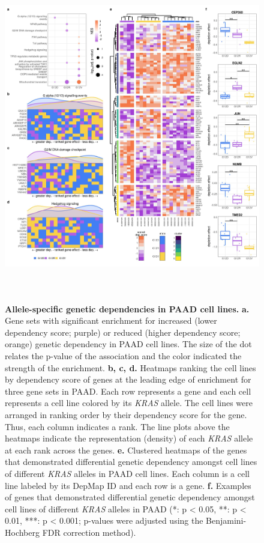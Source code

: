 \documentclass[english, 10pt, letterpaper]{article}
\newcommand{\KRAS}{\emph{KRAS}}
\begin{document}
\begin{figure}[p]
\centering
\includegraphics[height=145mm]{figures/Fig_5.jpeg}
\caption{
    \textbf{Allele-specific genetic dependencies in PAAD cell lines.}
    \textbf{a.} Gene sets with significant enrichment for increased (lower dependency score; purple) or reduced (higher dependency score; orange) genetic dependency in PAAD cell lines. The size of the dot relates the p-value of the association and the color indicated the strength of the enrichment.
    \textbf{b, c, d.} Heatmaps ranking the cell lines by dependency score of genes at the leading edge of enrichment for three gene sets in PAAD. Each row represents a gene and each cell represents a cell line colored by its \KRAS{} allele. The cell lines were arranged in ranking order by their dependency score for the gene. Thus, each column indicates a rank. The line plots above the heatmaps indicate the representation (density) of each \KRAS{} allele at each rank across the genes.
    \textbf{e.} Clustered heatmaps of the genes that demonstrated differential genetic dependency amongst cell lines of different \KRAS{} alleles in PAAD cell lines. Each column is a cell line labeled by its DepMap ID and each row is a gene.
    \textbf{f.} Examples of genes that demonstrated differential genetic dependency amongst cell lines of different \KRAS{} alleles in PAAD (*: p < 0.05, **: p < 0.01, ***: p < 0.001; p-values were adjusted using the Benjamini-Hochberg FDR correction method).
}
\label{fig:paad-dependency-main}
\end{figure}
\end{document}
